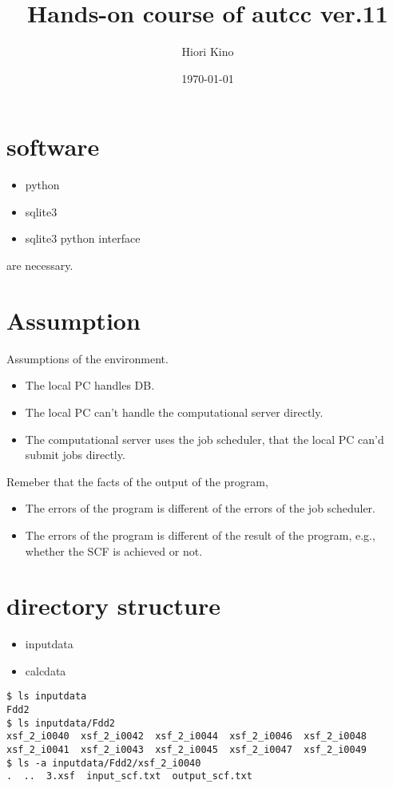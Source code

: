 \documentclass[a4paper]{article}
\title{Hands-on course of autcc ver.11}
\date{\today}
\author{Hiori Kino}
\begin{document}
\maketitle 

\section{software}

\begin{itemize}
\item python
\item sqlite3
\item sqlite3 python interface
\end{itemize}
are necessary.

\section{Assumption}
Assumptions of the environment.
\begin{itemize}
\item The local PC handles DB.
\item The local PC can't handle the computational server directly.
\item The computational server uses the job scheduler, that the local PC can'd submit jobs directly.
\end{itemize}
Remeber that the facts of the output of the program,
\begin{itemize}
\item The errors of the program is different of the errors of the job scheduler.
\item The errors of the program is different of the result of the program, e.g., whether the SCF is achieved or not.
\end{itemize}

\section{directory structure}

\begin{itemize}
\item inputdata\/ 
\item calcdata\/
\end{itemize}

\begin{verbatim}
$ ls inputdata
Fdd2
$ ls inputdata/Fdd2
xsf_2_i0040  xsf_2_i0042  xsf_2_i0044  xsf_2_i0046  xsf_2_i0048
xsf_2_i0041  xsf_2_i0043  xsf_2_i0045  xsf_2_i0047  xsf_2_i0049
$ ls -a inputdata/Fdd2/xsf_2_i0040
.  ..  3.xsf  input_scf.txt  output_scf.txt
\end{verbatim}
\end{document}
